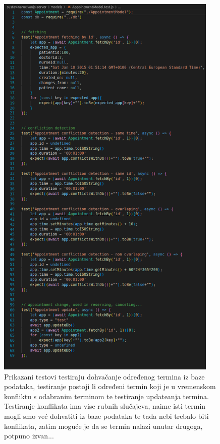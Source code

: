             \begin{figure}[H]
                    \includegraphics[width=300pt]{slike/appointment_tests_code.png} %
                    \caption{Prikazani testovi testiraju dohvačanje određenog termina iz baze podataka, testiranje postoji li određeni termin koji je u vremenskom konfliktu s odabranim terminom te testiranje updateanja termina. Testiranje konflikata ima vise rubnih slučajeva, naime isti termin mogli smo već dohvatiti iz baze podataka te tada nebi trebalo biti konflikata, zatim moguće je da se termin nalazi unutar drugoga, potpuno izvan...}
                    \label{fig:struktura} %
                \end{figure}

